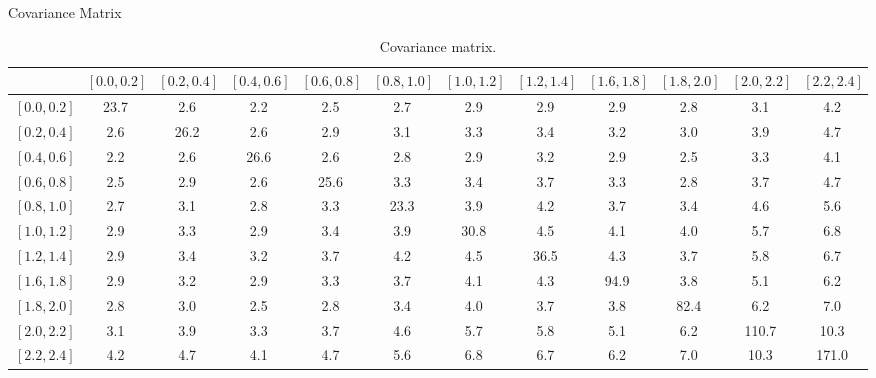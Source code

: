 \documentclass[t, 8pt]{beamer}
\begin{document}
\renewcommand\tabcolsep{0pt}
\renewcommand\arraystretch{1.6}
\begin{frame}{Covariance Matrix}
  \tiny{
  \begin{center}
    \begin{table}
    \begin{tabular}{l|ccccccccccc}
& \tiny{$\left[0.0,0.2\right]$}
& \tiny{$\left[0.2,0.4\right]$}
& \tiny{$\left[0.4,0.6\right]$} 
& \tiny{$\left[0.6,0.8\right]$}   
& \tiny{$\left[0.8,1.0\right]$}
& \tiny{$\left[1.0,1.2\right]$} 
& \tiny{$\left[1.2,1.4\right]$}
& \tiny{$\left[1.6,1.8\right]$}
& \tiny{$\left[1.8,2.0\right]$} 
& \tiny{$\left[2.0,2.2\right]$} 
& \tiny{$\left[2.2,2.4\right]$} \\ \hline
\tiny{$\left[0.0,0.2\right]$} & 23.7 & 2.6 & 2.2 & 2.5 & 2.7 & 2.9 & 2.9 & 2.9 & 2.8 & 3.1 & 4.2 \\
\tiny{$\left[0.2,0.4\right]$} & 2.6 & 26.2 & 2.6 & 2.9 & 3.1 & 3.3 & 3.4 & 3.2 & 3.0 & 3.9 & 4.7 \\
\tiny{$\left[0.4,0.6\right]$} & 2.2 & 2.6 & 26.6 & 2.6 & 2.8 & 2.9 & 3.2 & 2.9 & 2.5 & 3.3 & 4.1 \\
\tiny{$\left[0.6,0.8\right]$} & 2.5 & 2.9 & 2.6 & 25.6 & 3.3 & 3.4 & 3.7 & 3.3 & 2.8 & 3.7 & 4.7 \\
\tiny{$\left[0.8,1.0\right]$} & 2.7 & 3.1 & 2.8 & 3.3 & 23.3 & 3.9 & 4.2 & 3.7 & 3.4 & 4.6 & 5.6 \\
\tiny{$\left[1.0,1.2\right]$} & 2.9 & 3.3 & 2.9 & 3.4 & 3.9 & 30.8 & 4.5 & 4.1 & 4.0 & 5.7 & 6.8 \\
\tiny{$\left[1.2,1.4\right]$} & 2.9 & 3.4 & 3.2 & 3.7 & 4.2 & 4.5 & 36.5 & 4.3 & 3.7 & 5.8 & 6.7 \\
\tiny{$\left[1.6,1.8\right]$} & 2.9 & 3.2 & 2.9 & 3.3 & 3.7 & 4.1 & 4.3 & 94.9 & 3.8 & 5.1 & 6.2 \\
\tiny{$\left[1.8,2.0\right]$} & 2.8 & 3.0 & 2.5 & 2.8 & 3.4 & 4.0 & 3.7 & 3.8 & 82.4 & 6.2 & 7.0 \\ 
\tiny{$\left[2.0,2.2\right]$} & 3.1 & 3.9 & 3.3 & 3.7 & 4.6 & 5.7 & 5.8 & 5.1 & 6.2 & 110.7 & 10.3 \\
\tiny{$\left[2.2,2.4\right]$} & 4.2 & 4.7 & 4.1 & 4.7 & 5.6 & 6.8 & 6.7 & 6.2 & 7.0 & 10.3 & 171.0 \\
    \end{tabular}
    \caption{\label{tab:covar} Covariance matrix.}%
    \end{table}
  \end{center}
  }
\end{frame}
\renewcommand\tabcolsep{6pt}
\renewcommand\arraystretch{1.}
\end{document}
